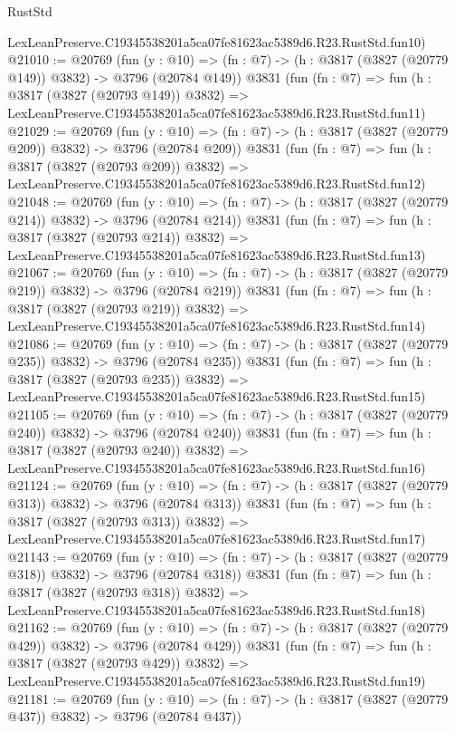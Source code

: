 \begin{lexlean}{RustStd}
\begin{coremodule}
    LexLeanPreserve.C19345538201a5ca07fe81623ac5389d6.R23.RustStd.fun10)
@21010 := @20769
    (fun (y : @10) => (fn : @7) -> (h : @3817 (@3827 (@20779 @149)) @3832) -> @3796 (@20784 @149))
    @3831
    (fun (fn : @7) =>
    fun (h : @3817 (@3827 (@20793 @149)) @3832) =>
    LexLeanPreserve.C19345538201a5ca07fe81623ac5389d6.R23.RustStd.fun11)
@21029 := @20769
    (fun (y : @10) => (fn : @7) -> (h : @3817 (@3827 (@20779 @209)) @3832) -> @3796 (@20784 @209))
    @3831
    (fun (fn : @7) =>
    fun (h : @3817 (@3827 (@20793 @209)) @3832) =>
    LexLeanPreserve.C19345538201a5ca07fe81623ac5389d6.R23.RustStd.fun12)
@21048 := @20769
    (fun (y : @10) => (fn : @7) -> (h : @3817 (@3827 (@20779 @214)) @3832) -> @3796 (@20784 @214))
    @3831
    (fun (fn : @7) =>
    fun (h : @3817 (@3827 (@20793 @214)) @3832) =>
    LexLeanPreserve.C19345538201a5ca07fe81623ac5389d6.R23.RustStd.fun13)
@21067 := @20769
    (fun (y : @10) => (fn : @7) -> (h : @3817 (@3827 (@20779 @219)) @3832) -> @3796 (@20784 @219))
    @3831
    (fun (fn : @7) =>
    fun (h : @3817 (@3827 (@20793 @219)) @3832) =>
    LexLeanPreserve.C19345538201a5ca07fe81623ac5389d6.R23.RustStd.fun14)
@21086 := @20769
    (fun (y : @10) => (fn : @7) -> (h : @3817 (@3827 (@20779 @235)) @3832) -> @3796 (@20784 @235))
    @3831
    (fun (fn : @7) =>
    fun (h : @3817 (@3827 (@20793 @235)) @3832) =>
    LexLeanPreserve.C19345538201a5ca07fe81623ac5389d6.R23.RustStd.fun15)
@21105 := @20769
    (fun (y : @10) => (fn : @7) -> (h : @3817 (@3827 (@20779 @240)) @3832) -> @3796 (@20784 @240))
    @3831
    (fun (fn : @7) =>
    fun (h : @3817 (@3827 (@20793 @240)) @3832) =>
    LexLeanPreserve.C19345538201a5ca07fe81623ac5389d6.R23.RustStd.fun16)
@21124 := @20769
    (fun (y : @10) => (fn : @7) -> (h : @3817 (@3827 (@20779 @313)) @3832) -> @3796 (@20784 @313))
    @3831
    (fun (fn : @7) =>
    fun (h : @3817 (@3827 (@20793 @313)) @3832) =>
    LexLeanPreserve.C19345538201a5ca07fe81623ac5389d6.R23.RustStd.fun17)
@21143 := @20769
    (fun (y : @10) => (fn : @7) -> (h : @3817 (@3827 (@20779 @318)) @3832) -> @3796 (@20784 @318))
    @3831
    (fun (fn : @7) =>
    fun (h : @3817 (@3827 (@20793 @318)) @3832) =>
    LexLeanPreserve.C19345538201a5ca07fe81623ac5389d6.R23.RustStd.fun18)
@21162 := @20769
    (fun (y : @10) => (fn : @7) -> (h : @3817 (@3827 (@20779 @429)) @3832) -> @3796 (@20784 @429))
    @3831
    (fun (fn : @7) =>
    fun (h : @3817 (@3827 (@20793 @429)) @3832) =>
    LexLeanPreserve.C19345538201a5ca07fe81623ac5389d6.R23.RustStd.fun19)
@21181 := @20769
    (fun (y : @10) => (fn : @7) -> (h : @3817 (@3827 (@20779 @437)) @3832) -> @3796 (@20784 @437))

\end{coremodule}
\end{lexlean}
